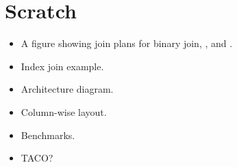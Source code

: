 

\section{Scratch}
\begin{itemize}
  \item A figure showing join plans for binary join, \GJ, and \FJ. 
  \item Index join example.
  \item Architecture diagram.
  \item Column-wise layout.
  \item Benchmarks.
  \item TACO?
\end{itemize}



